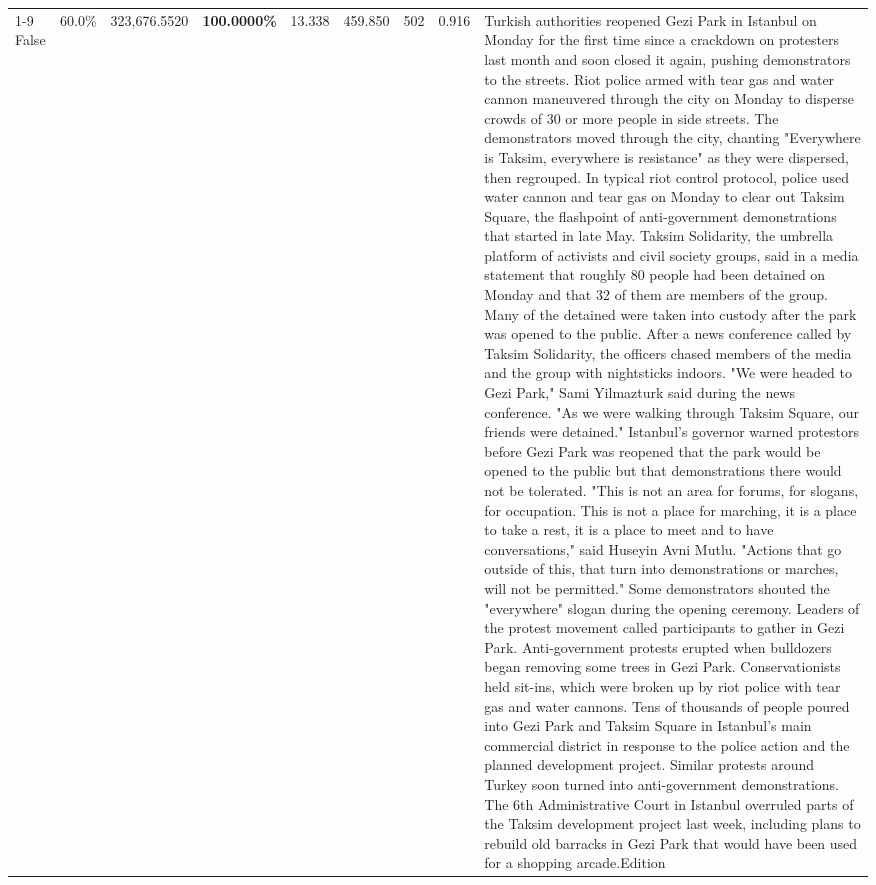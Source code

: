 \begin{table}[H]
\begin{tabular}{lllrlllll}
\cline{1-9}
False & 60.0\% & 323,676.5520 & \bfseries \color{red} 100.0000\% & 13.338 & 459.850 & 502 & 0.916 & Turkish authorities reopened Gezi Park in Istanbul on Monday for the first time since a crackdown on protesters last month and soon closed it again, pushing demonstrators to the streets. Riot police armed with tear gas and water cannon maneuvered through the city on Monday to disperse crowds of 30 or more people in side streets. The demonstrators moved through the city, chanting "Everywhere is Taksim, everywhere is resistance" as they were dispersed, then regrouped. In typical riot control protocol, police used water cannon and tear gas on Monday to clear out Taksim Square, the flashpoint of anti-government demonstrations that started in late May. Taksim Solidarity, the umbrella platform of activists and civil society groups, said in a media statement that roughly 80 people had been detained on Monday and that 32 of them are members of the group. Many of the detained were taken into custody after the park was opened to the public. After a news conference called by Taksim Solidarity, the officers chased members of the media and the group with nightsticks indoors. "We were headed to Gezi Park," Sami Yilmazturk said during the news conference. "As we were walking through Taksim Square, our friends were detained." Istanbul's governor warned protestors before Gezi Park was reopened that the park would be opened to the public but that demonstrations there would not be tolerated. "This is not an area for forums, for slogans, for occupation. This is not a place for marching, it is a place to take a rest, it is a place to meet and to have conversations," said Huseyin Avni Mutlu. "Actions that go outside of this, that turn into demonstrations or marches, will not be permitted." Some demonstrators shouted the "everywhere" slogan during the opening ceremony. Leaders of the protest movement called participants to gather in Gezi Park. Anti-government protests erupted when bulldozers began removing some trees in Gezi Park. Conservationists held sit-ins, which were broken up by riot police with tear gas and water cannons. Tens of thousands of people poured into Gezi Park and Taksim Square in Istanbul's main commercial district in response to the police action and the planned development project. Similar protests around Turkey soon turned into anti-government demonstrations. The 6th Administrative Court in Istanbul overruled parts of the Taksim development project last week, including plans to rebuild old barracks in Gezi Park that would have been used for a shopping arcade.Edition \\

\end{tabular}
\end{table}
